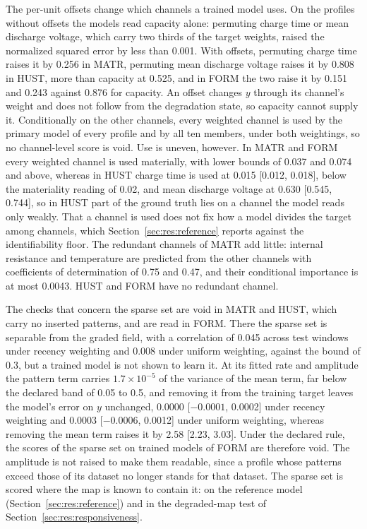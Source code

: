 \documentclass{article}
\begin{document}
The per-unit offsets change which channels a trained model uses. On the profiles without offsets the models read capacity alone: permuting charge time or mean discharge voltage, which carry two thirds of the target weights, raised the normalized squared error by less than 0.001. With offsets, permuting charge time raises it by 0.256 in MATR, permuting mean discharge voltage raises it by 0.808 in HUST, more than capacity at 0.525, and in FORM the two raise it by 0.151 and 0.243 against 0.876 for capacity. An offset changes $y$ through its channel's weight and does not follow from the degradation state, so capacity cannot supply it. Conditionally on the other channels, every weighted channel is used by the primary model of every profile and by all ten members, under both weightings, so no channel-level score is void. Use is uneven, however. In MATR and FORM every weighted channel is used materially, with lower bounds of 0.037 and 0.074 and above, whereas in HUST charge time is used at 0.015 [0.012, 0.018], below the materiality reading of 0.02, and mean discharge voltage at 0.630 [0.545, 0.744], so in HUST part of the ground truth lies on a channel the model reads only weakly. That a channel is used does not fix how a model divides the target among channels, which Section~\ref{sec:res:reference} reports against the identifiability floor. The redundant channels of MATR add little: internal resistance and temperature are predicted from the other channels with coefficients of determination of 0.75 and 0.47, and their conditional importance is at most 0.0043. HUST and FORM have no redundant channel.

The checks that concern the sparse set are void in MATR and HUST, which carry no inserted patterns, and are read in FORM. There the sparse set is separable from the graded field, with a correlation of 0.045 across test windows under recency weighting and 0.008 under uniform weighting, against the bound of 0.3, but a trained model is not shown to learn it. At its fitted rate and amplitude the pattern term carries $1.7\times10^{-5}$ of the variance of the mean term, far below the declared band of 0.05 to 0.5, and removing it from the training target leaves the model's error on $y$ unchanged, 0.0000 [$-0.0001$, 0.0002] under recency weighting and 0.0003 [$-0.0006$, 0.0012] under uniform weighting, whereas removing the mean term raises it by 2.58 [2.23, 3.03]. Under the declared rule, the scores of the sparse set on trained models of FORM are therefore void. The amplitude is not raised to make them readable, since a profile whose patterns exceed those of its dataset no longer stands for that dataset. The sparse set is scored where the map is known to contain it: on the reference model (Section~\ref{sec:res:reference}) and in the degraded-map test of Section~\ref{sec:res:responsiveness}.
\end{document}
